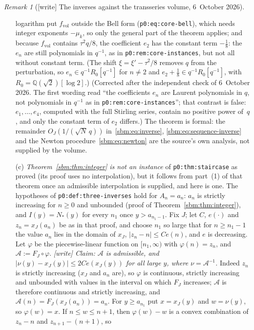 \documentclass[11pt,letterpaper]{article}
\numberwithin{equation}{section}
\theoremstyle{remark}\newtheorem{remark}[theorem]{Remark}
\newcommand{\QQ}{\mathbb Q}
\newcommand{\file}[1]{\nolinkurl{#1}}
\begin{document}
\begin{remark}[{[write]} The inverses against the transseries volume, 6~October 2026]
\begin{enumerate}
 logarithm put $f_{\mathrm{vol}}$ outside the Bell form
 (\file{p0:eq:core-bell}), which needs integer exponents $-\mu_k$, so only the
 general part of the theorem applies; and because $f_{\mathrm{vol}}$
 contains $\tau^2q/8$, the coefficient $e_2$ has the constant term
 $-\tfrac18$: the $e_n$ are still polynomials in $q^{-1}$, as in
 \file{p0:rem:core-instances}, but not all without constant term. (The shift
 $\xi=\xi'-\tau^2/8$ removes $q$ from the perturbation, so
 $e_n\in q^{-1}R_0[q^{-1}]$ for $n\ne2$ and
 $e_2+\tfrac18\in q^{-1}R_0[q^{-1}]$, with $R_0=\QQ(\sqrt2)[\log2]$.)
 \textup{(Corrected after the independent check of 6~October 2026. The first
 wording read ``the coefficients $e_n$ are Laurent polynomials in $q$, not
 polynomials in $q^{-1}$ as in \file{p0:rem:core-instances}''; that contrast
 is false: $e_1,\dots,e_4$, computed with the full Stirling series, contain
 no positive power of~$q$, and only the constant term of $e_2$ differs.)} The
 theorem
 is formal: the remainder $O_J(1/(\sqrt N\,q))$ in~\eqref{sbm:eq:inverse},
 \eqref{sbm:eq:sequence-inverse} and the Newton procedure~\eqref{sbm:eq:newton}
 are the source's own analysis, not supplied by the volume.
\item[(c)] \emph{Theorem~\ref{sbm:thm:integer} is not an instance} of
 \file{p0:thm:staircase} as proved (its proof uses no interpolation), but it
 follows from part~(1) of that theorem once an admissible interpolation is
 supplied, and here is one. The hypotheses of \file{p0:def:three-inverses}
 hold for $A_n=a_n$: $a_n$ is strictly increasing for $n\ge0$ and unbounded
 (proof of Theorem~\ref{sbm:thm:integer}), and $I(y)=N_\ast(y)$ for every
 $n_1$ once $y>a_{n_1-1}$. Fix $J$; let $C$, $e(\cdot)$ and $z_n=x_J(a_n)$ be
 as in that proof, and choose $n_1$ so large that for $n\ge n_1-1$ the value
 $a_n$ lies in the domain of $x_J$, $|z_n-n|\le Ce(n)$, and $e$ is decreasing.
 Let $\varphi$ be the piecewise-linear function on $[n_1,\infty)$ with
 $\varphi(n)=z_n$, and $\mathcal A:=F_J\circ\varphi$. \emph{[write] Claim:
 $\mathcal A$ is admissible, and $|\nu(y)-x_J(y)|\le2Ce(x_J(y))$ for all
 large $y$, where $\nu=\mathcal A^{-1}$.} Indeed $z_n$ is strictly increasing
 ($x_J$ and $a_n$ are), so $\varphi$ is continuous, strictly increasing and
 unbounded with values in the interval on which $F_J$ increases;
 $\mathcal A$ is therefore continuous and strictly increasing, and
 $\mathcal A(n)=F_J(x_J(a_n))=a_n$. For $y\ge a_{n_1}$ put $x=x_J(y)$ and
 $w=\nu(y)$, so $\varphi(w)=x$. If $n\le w\le n+1$, then $\varphi(w)-w$ is a
 convex combination of $z_n-n$ and $z_{n+1}-(n+1)$, so

\end{enumerate}
\end{remark}
\end{document}
